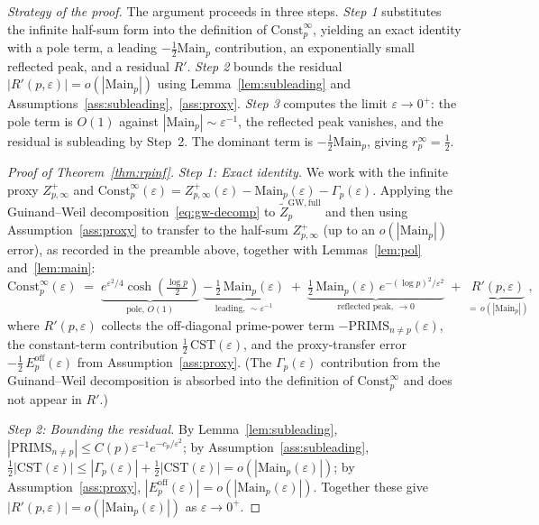 \documentclass[11pt]{article}
\begin{document}
\smallskip
\noindent\emph{Strategy of the proof.}
The argument proceeds in three steps.
\emph{Step 1} substitutes the infinite half-sum form into the
definition of $\mathrm{Const}_p^\infty$, yielding an exact
identity with a pole term, a leading $-\tfrac12\mathrm{Main}_p$
contribution, an exponentially small reflected peak, and a
residual $R'$.
\emph{Step 2} bounds the residual $|R'(p,\varepsilon)|
=o(|\mathrm{Main}_p|)$ using Lemma~\ref{lem:subleading}
and Assumptions~\ref{ass:subleading},~\ref{ass:proxy}.
\emph{Step 3} computes the limit $\varepsilon\to 0^+$:
the pole term is $O(1)$ against $|\mathrm{Main}_p|\sim\varepsilon^{-1}$,
the reflected peak vanishes, and the residual is subleading by Step~2.
The dominant term is $-\tfrac12\mathrm{Main}_p$, giving
$r_p^\infty=\tfrac12$.

\begin{proof}[Proof of Theorem~\ref{thm:rpinf}]
\textit{Step 1: Exact identity.}
We work with the infinite proxy $Z_{p,\infty}^+$ and
$\mathrm{Const}_p^\infty(\varepsilon)
=Z_{p,\infty}^+(\varepsilon)-\mathrm{Main}_p(\varepsilon)-\Gamma_p(\varepsilon)$.
Applying the Guinand--Weil decomposition~\eqref{eq:gw-decomp} to
$\widetilde Z_p^{\mathrm{GW,full}}$ and then using
Assumption~\ref{ass:proxy} to transfer to the half-sum
$Z_{p,\infty}^+$ (up to an $o(|\mathrm{Main}_p|)$ error), as
recorded in the preamble above, together with
Lemmas~\ref{lem:pol} and~\ref{lem:main}:
\[
\mathrm{Const}_p^\infty(\varepsilon)
  \;=\; \underbrace{e^{\varepsilon^2/4}\cosh\!\left(\tfrac{\log p}{2}\right)}_{\text{pole, } O(1)}
        \;\underbrace{-\, \tfrac12\,\mathrm{Main}_p(\varepsilon)}_{\text{leading, } \sim\varepsilon^{-1}}
        \;+\; \underbrace{\tfrac12\,\mathrm{Main}_p(\varepsilon)\,
              e^{-(\log p)^2/\varepsilon^2}}_{\text{reflected peak, } \to 0}
        \;+\; \underbrace{R'(p,\varepsilon)}_{=\,o(|\mathrm{Main}_p|)},
\]
where $R'(p,\varepsilon)$ collects the off-diagonal prime-power term
$-\mathrm{PRIMS}_{n\ne p}(\varepsilon)$, the constant-term contribution
$\tfrac12\,\mathrm{CST}(\varepsilon)$, and the proxy-transfer error
$-\tfrac12\,E_p^{\mathrm{off}}(\varepsilon)$ from
Assumption~\ref{ass:proxy}.
(The $\Gamma_p(\varepsilon)$ contribution from the
Guinand--Weil decomposition is absorbed into the definition of
$\mathrm{Const}_p^\infty$ and does not appear in $R'$.)

\textit{Step 2: Bounding the residual.}
By Lemma~\ref{lem:subleading},
$|\mathrm{PRIMS}_{n\ne p}|\le C(p)\varepsilon^{-1}e^{-c_p/\varepsilon^2}$;
by Assumption~\ref{ass:subleading},
$\tfrac12|\mathrm{CST}(\varepsilon)|
\le|\Gamma_p(\varepsilon)|+\tfrac12|\mathrm{CST}(\varepsilon)|
=o(|\mathrm{Main}_p(\varepsilon)|)$;
by Assumption~\ref{ass:proxy},
$|E_p^{\mathrm{off}}(\varepsilon)|=o(|\mathrm{Main}_p(\varepsilon)|)$.
Together these give $|R'(p,\varepsilon)|=o(|\mathrm{Main}_p(\varepsilon)|)$
as $\varepsilon\to 0^+$.


\end{proof}
\end{document}
